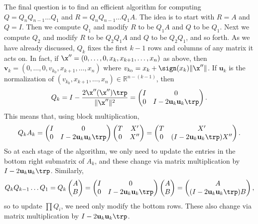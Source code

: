 The final question is to find an efficient algorithm for computing $Q = Q_nQ_{n-1} \ldots Q_1$ and $R = Q_nQ_{n-1} \ldots Q_1A$.
The idea is to start with $R=A$ and $Q = I$. Then we compute $Q_1$ and modify $R$ to be $Q_1A$ and $Q$ to be $Q_1$.
Next we compute $Q_2$ and modify $R$ to be $Q_2Q_1A$ and $Q$ to be $Q_2Q_1$, and so forth.
As we have already discussed, $Q_k$ fixes the first $k-1$ rows and columns of any matrix it acts on.
In fact, if $\x'' = (0, \ldots, 0, x_k, x_{k+1}, \ldots, x_n)$ as above, then $\mathbf{v}_k = (0, \ldots, 0, v_{k_0}, x_{k+1}, \ldots, x_n)$ where $v_{k_0} = x_k + \sign(x_k) \| \x'' \|$.
If $\mathbf{u}_k$ is the normalization of $(v_{k_0}, x_{k+1}, \ldots, x_n) \in \mathbb{R}^{n-(k-1)}$, then
\[
Q_k = I-\frac{2\x''(\x'')\trp}{\|\x''\|^2} =  \begin{pmatrix}
I & 0 \\
0 & I-2\mathbf{u}_k\mathbf{u}_k\trp
\end{pmatrix}.
\]
This means that, using block multiplication,
\[
Q_kA_k =  \begin{pmatrix}
I & 0 \\
0 & I-2\mathbf{u}_k\mathbf{u}_k\trp
\end{pmatrix}\begin{pmatrix}
T & X' \\
0 & X''
\end{pmatrix} = \begin{pmatrix}
T & X' \\
0 & ( I-2\mathbf{u}_k\mathbf{u}_k\trp)X''
\end{pmatrix}.
\]
So at each stage of the algorithm, we only need to update the entries in the bottom right submatrix of $A_k$, and these change via matrix multiplication by $ I-2\mathbf{u}_k\mathbf{u}_k\trp$. Similarly,
\[
Q_kQ_{k-1}\ldots Q_1 = Q_k \begin{pmatrix}
A\\
B
\end{pmatrix} = \begin{pmatrix}
I & 0 \\
0 & I-2\mathbf{u}_k\mathbf{u}_k\trp
\end{pmatrix}\begin{pmatrix}
A\\
B
\end{pmatrix} = \begin{pmatrix}
A\\
(I-2\mathbf{u}_k\mathbf{u}_k\trp)B
\end{pmatrix},
\]
so to update $\prod Q_i$, we need only modify the bottom rows.
These also change via matrix multiplication by $I-2\mathbf{u}_k\mathbf{u}_k\trp$.

